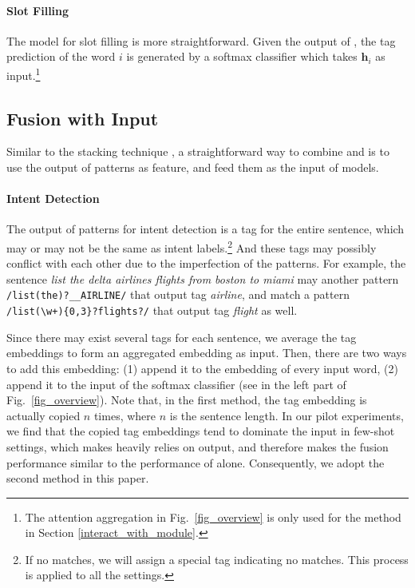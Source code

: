 \paragraph{Slot Filling}
The model for slot filling is more straightforward. Given the output of \BLSTM, the tag prediction of the word $i$ is generated by a softmax classifier which takes $\textbf{h}_i$ as input.\footnote{The attention aggregation in Fig.~\ref{fig_overview} is only used for the method in Section \ref{interact_with_module}.}


\subsection{Fusion with Input}
\label{fusion_with_input}
Similar to the stacking technique \cite{wolpert1992stacked}, a straightforward way to combine \RE and \NN is to use the output of \RE patterns as feature, and feed them as the input of \NN models.
\paragraph{Intent Detection}
The output of \RE patterns for intent detection is a tag for the entire sentence, which may or may not be the same as intent labels.\footnote{If no \RE matches, we will assign a special tag indicating no matches. This process is applied to all the settings.} 
And these tags may possibly conflict with each other due to the imperfection of the patterns. 
For example, the sentence \emph{list the delta airlines flights from boston to miami} may another pattern \texttt{/list(\;the)?\;\_\_AIRLINE/} that output tag \emph{airline}, 
and match a pattern \texttt{/list(\;\textbackslash w+)\{0,3\}?\;flights?/} that output tag \emph{flight} as well.

Since there may exist several \RE tags for each sentence, we average the tag embeddings to form an aggregated embedding as input. 
Then, there are two ways to add this embedding: (1) append it to the embedding of every input word, (2) append it to the input of the softmax classifier (see  in the left part of Fig.~\ref{fig_overview}).
Note that, in the first method, the tag embedding is actually copied $n$ times, where $n$ is the sentence length. 
In our pilot experiments, we find that the copied tag embeddings tend to dominate the input in few-shot settings, which makes \NN heavily relies on \RE output, and therefore makes the fusion performance similar to the performance of \RE alone. Consequently, we adopt the second method in this paper.

